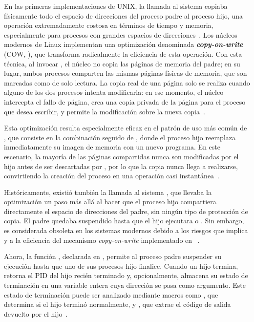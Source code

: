 En las primeras implementaciones de UNIX, la llamada al sistema  copiaba físicamente todo el espacio de direcciones del proceso padre al proceso hijo, una operación extremadamente costosa en términos de tiempo y memoria, especialmente para procesos con grandes espacios de direcciones~\cite{love2013}. Los núcleos modernos de Linux implementan una optimización denominada \textbf{\textit{copy-on-write}} (COW, ), que transforma radicalmente la eficiencia de esta operación. Con esta técnica, al invocar , el núcleo no copia las páginas de memoria del padre; en su lugar, ambos procesos comparten las mismas páginas físicas de memoria, que son marcadas como de solo lectura. La copia real de una página solo se realiza cuando alguno de los dos procesos intenta modificarla: en ese momento, el núcleo intercepta el fallo de página, crea una copia privada de la página para el proceso que desea escribir, y permite la modificación sobre la nueva copia~\cite{tanenbaum2015}.

Esta optimización resulta especialmente eficaz en el patrón de uso más común de , que consiste en la combinación  seguido de , donde el proceso hijo reemplaza inmediatamente su imagen de memoria con un nuevo programa. En este escenario, la mayoría de las páginas compartidas nunca son modificadas por el hijo antes de ser descartadas por , por lo que la copia nunca llega a realizarse, convirtiendo la creación del proceso en una operación casi instantánea~\cite{love2013}.

Históricamente, existió también la llamada al sistema , que llevaba la optimización un paso más allá al hacer que el proceso hijo compartiera directamente el espacio de direcciones del padre, sin ningún tipo de protección de copia. El padre quedaba suspendido hasta que el hijo ejecutara  o . Sin embargo,  es considerada obsoleta en los sistemas modernos debido a los riesgos que implica y a la eficiencia del mecanismo \textit{copy-on-write} implementado en ~\cite{kerrisk2010}.


Ahora, la función , declarada en , permite al proceso padre suspender su ejecución hasta que uno de sus procesos hijo finalice. Cuando un hijo termina,  retorna el PID del hijo recién terminado y, opcionalmente, almacena su estado de terminación en una variable entera cuya dirección se pasa como argumento. Este estado de terminación puede ser analizado mediante macros como , que determina si el hijo terminó normalmente, y , que extrae el código de salida devuelto por el hijo~\cite{stevens2013}.

